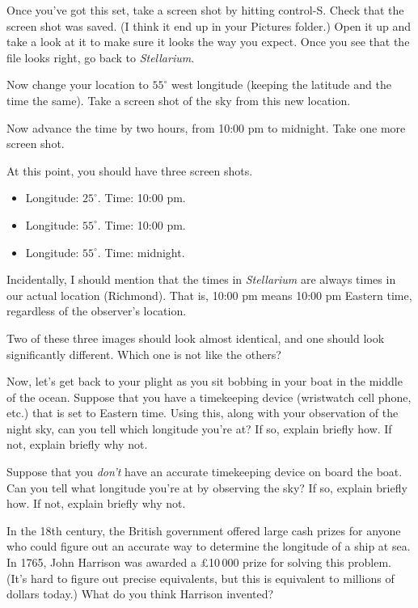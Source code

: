 Once you've got this set, take a screen shot by hitting control-S.
Check that the screen shot was saved. (I think
it end up in your Pictures folder.)
Open it up and take a look at it to make sure it looks
the way you expect. 
Once you see that the file looks right, go back to \textit{Stellarium}.

Now change your location to $55^\circ$ west longitude (keeping
the latitude and the time the same).
Take a screen shot of the sky from this new location.

Now advance the time by two hours, from 10:00 pm to midnight.
Take one more screen shot.

At this point, you should have three screen shots.
\begin{itemize}[nosep]
\item Longitude: $25^\circ$. Time: 10:00 pm.
\item Longitude: $55^\circ$. Time: 10:00 pm.
\item Longitude: $55^\circ$. Time: midnight.
\end{itemize}
Incidentally, I should mention that the times in \textit{Stellarium}
are always times in our actual location (Richmond). That is, 10:00 pm
means 10:00 pm Eastern time, regardless of the observer's location.

Two of these three images should look almost identical, and one
should look significantly different. Which one is not like the others?

\answerspace{1in}

\pagebreak[2]

Now, let's get back to your plight as you sit bobbing in your boat
in the middle of the ocean. Suppose that you have a timekeeping
device (wristwatch cell phone, etc.) that is set to Eastern
time. Using this, along with your observation of the night
sky, can you tell which longitude you're at? If so, explain
briefly how. If not, explain briefly why not.

\answerspace{3in}

Suppose that you \textit{don't} have an accurate timekeeping device
on board the boat. Can you tell what longitude you're at by
observing the sky? If so, explain
briefly how. If not, explain briefly why not.

\answerspace{3in}

\pagebreak[1]

In the 18th century, the British government offered large
cash prizes for anyone who could figure out an accurate way
to determine the longitude of a ship at sea. 
In 1765, John Harrison was awarded a \pounds 10\,000 prize
for solving this problem. (It's hard to
figure out precise equivalents, but this is 
equivalent to  millions of dollars today.) 
What do you think Harrison invented?

